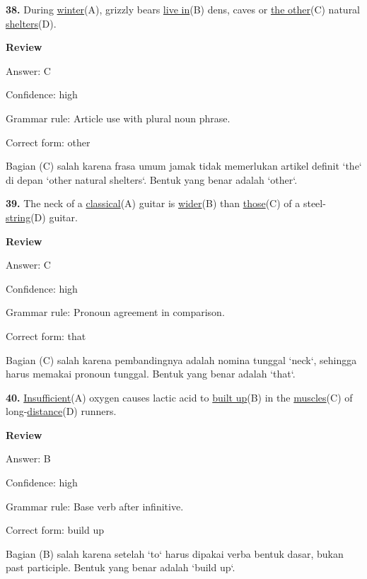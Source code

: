 \documentclass[12pt]{article}
\begin{document}
\endgroup
\par
\vspace{\questionblockgap}
\noindent\textbf{38.} During \uline{winter}(A), grizzly bears \uline{live in}(B) dens, caves or \uline{the other}(C) natural \uline{shelters}(D).
\par
\begingroup
\setlength{\parskip}{0pt}
\setlength{\parindent}{0pt}
\textbf{Review}\par
Answer: C\par
Confidence: high\par
Grammar rule: Article use with plural noun phrase.\par
Correct form: other\par
Bagian (C) salah karena frasa umum jamak tidak memerlukan artikel definit `the` di depan `other natural shelters`. Bentuk yang benar adalah `other`.\par
\endgroup
\par
\vspace{\questionblockgap}
\noindent\textbf{39.} The neck of a \uline{classical}(A) guitar is \uline{wider}(B) than \uline{those}(C) of a steel-\uline{string}(D) guitar.
\par
\begingroup
\setlength{\parskip}{0pt}
\setlength{\parindent}{0pt}
\textbf{Review}\par
Answer: C\par
Confidence: high\par
Grammar rule: Pronoun agreement in comparison.\par
Correct form: that\par
Bagian (C) salah karena pembandingnya adalah nomina tunggal `neck`, sehingga harus memakai pronoun tunggal. Bentuk yang benar adalah `that`.\par
\endgroup
\par
\vspace{\questionblockgap}
\noindent\textbf{40.} \uline{Insufficient}(A) oxygen causes lactic acid to \uline{built up}(B) in the \uline{muscles}(C) of long-\uline{distance}(D) runners.
\par
\begingroup
\setlength{\parskip}{0pt}
\setlength{\parindent}{0pt}
\textbf{Review}\par
Answer: B\par
Confidence: high\par
Grammar rule: Base verb after infinitive.\par
Correct form: build up\par
Bagian (B) salah karena setelah `to` harus dipakai verba bentuk dasar, bukan past participle. Bentuk yang benar adalah `build up`.\par
\endgroup
\par
\vspace{\questionblockgap}
\end{document}

